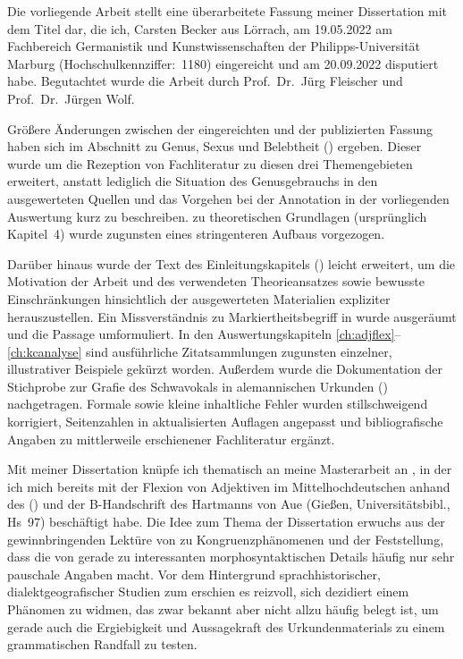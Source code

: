 \addchap{\lsPrefaceTitle}

Die vorliegende Arbeit stellt eine überarbeitete Fassung meiner Dissertation
mit dem Titel  dar, die ich, Carsten Becker aus Lörrach, am
19.05.2022 am Fachbereich Germanistik und Kunstwissenschaften der
Philipps-Universität Marburg (Hochschulkennziffer:~1180) eingereicht und am
20.09.2022 disputiert habe. Begutachtet wurde die Arbeit durch Prof.~Dr.~Jürg
Fleischer und Prof.~Dr.~Jürgen Wolf.

Größere Änderungen zwischen der eingereichten und der publizierten Fassung
haben sich im Abschnitt zu Genus, Sexus und Belebtheit ()
ergeben. Dieser wurde um die Rezeption von Fachliteratur zu diesen drei
Themengebieten erweitert, anstatt lediglich die Situation des Genusgebrauchs in
den ausgewerteten Quellen und das Vorgehen bei der Annotation in der
vorliegenden Auswertung kurz zu beschreiben.  zu
theoretischen Grundlagen (ursprünglich Kapitel~4) wurde zugunsten eines
stringenteren Aufbaus vorgezogen.

Darüber hinaus wurde der Text des Einleitungskapitels ()
leicht erweitert, um die Motivation der Arbeit und des verwendeten
Theorieansatzes sowie bewusste Einschränkungen hinsichtlich der ausgewerteten
Materialien expliziter herauszustellen. Ein Missverständnis zu
 Markiertheitsbegriff in 
wurde ausgeräumt und die Passage umformuliert. In den Auswertungs\-kapiteln
\ref{ch:adjflex}--\ref{ch:kcanalyse} sind ausführliche Zitatsammlungen
zugunsten einzelner, illustrativer Beispiele gekürzt worden. Außerdem wurde die
Dokumentation der Stich\-probe zur Grafie des Schwa\-vokals in alemannischen
Urkunden () nachgetragen. Formale sowie kleine
inhaltliche Fehler wurden stillschweigend korrigiert, Seitenzahlen in
aktualisierten Auflagen angepasst und bibliografische Angaben zu mittlerweile
erschienener Fachliteratur ergänzt.

Mit meiner Dissertation knüpfe ich thematisch an meine Masterarbeit an
\autocite{becker2016}, in der ich mich bereits mit der Flexion von Adjektiven
im Mittelhochdeutschen anhand des  (\CAO) und der B-Handschrift des  Hartmanns von
Aue (Gießen, Universitätsbibl., Hs~97) beschäftigt habe. Die Idee zum Thema der
Dissertation erwuchs aus der gewinnbringenden Lektüre von \citet{corbett2006}
zu Kongruenz\-phänomenen und der Feststellung, dass die  von \citet{paul2007} gerade zu interessanten morpho\-syntaktischen
Details häufig nur sehr pauschale Angaben macht. Vor dem Hintergrund
sprach\-historischer, dialekt\-geografischer Studien zum \CAO{}
\autocite{beckerschallert2021,beckerschallert2022a, beckerschallert2022b}
erschien es reizvoll, sich dezidiert einem Phänomen zu widmen, das zwar bekannt
aber nicht allzu häufig belegt ist, um gerade auch die Ergiebigkeit und
Aussagekraft des Urkunden\-materials zu einem grammatischen Randfall zu testen.

